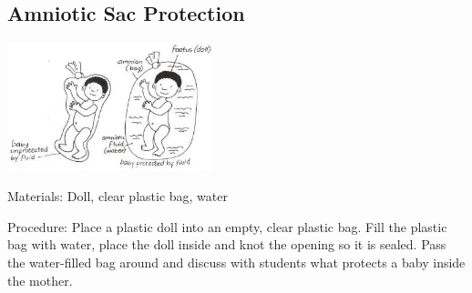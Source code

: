 \begin{multicols}{2}
\subsection{Amniotic Sac Protection}

\begin{center}
\includegraphics[width=0.45\textwidth]{./img/vso/amniotic-sac.jpg}
\end{center}

\begin{description*}
\item[Materials:]{Doll, clear plastic bag, water}
\item[Procedure:]{Place a plastic doll into an empty,
clear plastic bag. Fill the plastic
bag with water, place the doll
inside and knot the opening so it
is sealed. Pass the water-filled bag
around and discuss with students
what protects a baby inside the
mother.}
\end{description*}


\end{multicols}

\pagebreak